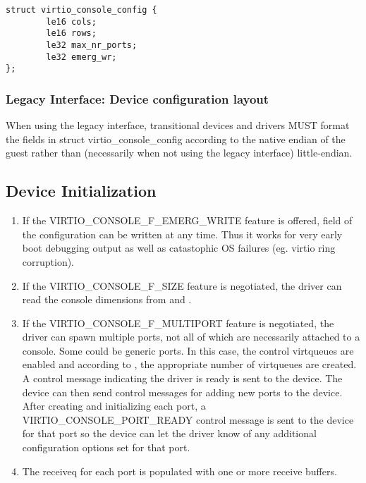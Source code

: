 \begin{lstlisting}
struct virtio_console_config {
        le16 cols;
        le16 rows;
        le32 max_nr_ports;
        le32 emerg_wr;
};
\end{lstlisting}

\subsubsection{Legacy Interface: Device configuration layout}\label{sec:Device Types / Console Device / Device configuration layout / Legacy Interface: Device configuration layout}
When using the legacy interface, transitional devices and drivers
MUST format the fields in struct virtio_console_config
according to the native endian of the guest rather than
(necessarily when not using the legacy interface) little-endian.

\subsection{Device Initialization}\label{sec:Device Types / Console Device / Device Initialization}

\begin{enumerate}
\item If the VIRTIO_CONSOLE_F_EMERG_WRITE feature is offered,
   field of the configuration can be written at any time.
  Thus it works for very early boot debugging output as well as
  catastophic OS failures (eg. virtio ring corruption).

\item If the VIRTIO_CONSOLE_F_SIZE feature is negotiated, the driver
  can read the console dimensions from  and .

\item If the VIRTIO_CONSOLE_F_MULTIPORT feature is negotiated, the
  driver can spawn multiple ports, not all of which are necessarily
  attached to a console. Some could be generic ports. In this
  case, the control virtqueues are enabled and according to
  , the appropriate number
  of virtqueues are created. A control message indicating the
  driver is ready is sent to the device. The device can then send
  control messages for adding new ports to the device. After
  creating and initializing each port, a
  VIRTIO_CONSOLE_PORT_READY control message is sent to the device
  for that port so the device can let the driver know of any additional
  configuration options set for that port.

\item The receiveq for each port is populated with one or more
  receive buffers.
\end{enumerate}

